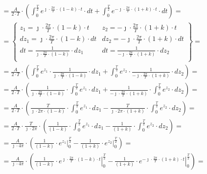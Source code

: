 \begin{task}
\begin{align*}
&=\frac{A}{2\cdot T}\cdot \left( \int_{0}^{\frac{T}{2}} e^{\jmath \cdot \frac{2\pi}{T} \cdot \left(1 -k\right) \cdot t} \cdot dt + \int_{0}^{\frac{T}{2}} e^{-\jmath \cdot \frac{2\pi}{T} \cdot \left(1+k\right)\cdot t } \cdot dt \right)=\\
&=\begin{Bmatrix}
z_1=\jmath \cdot \frac{2\pi}{T} \cdot \left(1 -k\right) \cdot t & z_2=-\jmath \cdot \frac{2\pi}{T} \cdot \left(1+k\right)\cdot t\\
dz_1=\jmath \cdot \frac{2\pi}{T} \cdot \left(1 -k\right) \cdot dt & dz_2=-\jmath \cdot \frac{2\pi}{T} \cdot \left(1+k\right)\cdot dt\\
dt=\frac{1}{\jmath \cdot \frac{2\pi}{T} \cdot \left(1 -k\right)} \cdot dz_1 & dt=\frac{1}{-\jmath \cdot \frac{2\pi}{T} \cdot \left(1+k\right)}\cdot dz_2\\
\end{Bmatrix}=\\
&=\frac{A}{2\cdot T}\cdot \left( \int_{0}^{\frac{T}{2}} e^{z_1} \cdot \frac{1}{\jmath \cdot \frac{2\pi}{T} \cdot \left(1 -k\right)} \cdot dz_1 + \int_{0}^{\frac{T}{2}} e^{z_2 } \cdot \frac{1}{-\jmath \cdot \frac{2\pi}{T} \cdot \left(1+k\right)}\cdot dz_2 \right)=\\
&=\frac{A}{2\cdot T}\cdot \left( \frac{1}{\jmath \cdot \frac{2\pi}{T} \cdot \left(1 -k\right)} \cdot \int_{0}^{\frac{T}{2}} e^{z_1} \cdot dz_1 + \frac{1}{-\jmath \cdot \frac{2\pi}{T} \cdot \left(1+k\right)}\cdot \int_{0}^{\frac{T}{2}} e^{z_2 } \cdot dz_2 \right)=\\
&=\frac{A}{2\cdot T}\cdot \left( \frac{T}{\jmath \cdot 2\pi \cdot \left(1 -k\right)} \cdot \int_{0}^{\frac{T}{2}} e^{z_1} \cdot dz_1 - \frac{T}{\jmath \cdot 2\pi \cdot \left(1+k\right)}\cdot \int_{0}^{\frac{T}{2}} e^{z_2 } \cdot dz_2 \right)=\\
&=\frac{A}{2\cdot T}\cdot \frac{T}{\jmath \cdot 2\pi} \cdot \left( \frac{1}{\left(1 -k\right)} \cdot \int_{0}^{\frac{T}{2}} e^{z_1} \cdot dz_1 - \frac{1}{ \left(1+k\right)}\cdot \int_{0}^{\frac{T}{2}} e^{z_2 } \cdot dz_2 \right)=\\
&=\frac{A}{\jmath \cdot 4\pi} \cdot \left( \frac{1}{\left(1 -k\right)} \cdot \left. e^{z_1} \right|_{0}^{\frac{T}{2}} - \frac{1}{ \left(1+k\right)}\cdot \left. e^{z_2 } \right|_{0}^{\frac{T}{2}} \right)=\\
&=\frac{A}{\jmath \cdot 4\pi} \cdot \left( \frac{1}{\left(1 -k\right)} \cdot \left. e^{\jmath \cdot \frac{2\pi}{T} \cdot \left(1 -k\right) \cdot t} \right|_{0}^{\frac{T}{2}} - \frac{1}{ \left(1+k\right)}\cdot \left. e^{-\jmath \cdot \frac{2\pi}{T} \cdot \left(1+k\right)\cdot t } \right|_{0}^{\frac{T}{2}} \right)=\\

\end{align*}
\end{task}
